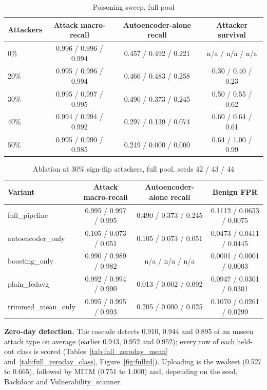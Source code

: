 \begin{table}[H]
\centering
\small
\setlength{\tabcolsep}{3pt}
\renewcommand{\arraystretch}{1.15}
\begin{tabular}{|l|c|c|c|}
\hline
\textbf{Attackers} & \textbf{Attack macro-recall} & \textbf{Autoencoder-alone recall} & \textbf{Attacker survival} \\ \hline
0\% & 0.996 / 0.996 / 0.994 & 0.457 / 0.492 / 0.221 & n/a / n/a / n/a \\ \hline
20\% & 0.995 / 0.996 / 0.994 & 0.466 / 0.483 / 0.258 & 0.30 / 0.40 / 0.23 \\ \hline
30\% & 0.995 / 0.997 / 0.995 & 0.490 / 0.373 / 0.245 & 0.50 / 0.55 / 0.62 \\ \hline
40\% & 0.994 / 0.994 / 0.992 & 0.297 / 0.139 / 0.074 & 0.60 / 0.64 / 0.61 \\ \hline
50\% & 0.995 / 0.990 / 0.985 & 0.249 / 0.000 / 0.000 & 0.64 / 1.00 / 0.99 \\ \hline
\end{tabular}
\caption{Poisoning sweep, full pool}
\label{tab:full_sweep}
\end{table}
\begin{table}[H]
\centering
\small
\setlength{\tabcolsep}{3pt}
\renewcommand{\arraystretch}{1.15}
\begin{tabular}{|l|c|c|c|}
\hline
\textbf{Variant} & \textbf{Attack macro-recall} & \textbf{Autoencoder-alone recall} & \textbf{Benign FPR} \\ \hline
full\_pipeline & 0.995 / 0.997 / 0.995 & 0.490 / 0.373 / 0.245 & 0.1112 / 0.0653 / 0.0075 \\ \hline
autoencoder\_only & 0.105 / 0.073 / 0.051 & 0.105 / 0.073 / 0.051 & 0.0473 / 0.0411 / 0.0445 \\ \hline
boosting\_only & 0.990 / 0.989 / 0.982 & n/a / n/a / n/a & 0.0001 / 0.0001 / 0.0003 \\ \hline
plain\_fedavg & 0.992 / 0.994 / 0.990 & 0.013 / 0.002 / 0.092 & 0.0947 / 0.0301 / 0.0301 \\ \hline
trimmed\_mean\_only & 0.995 / 0.995 / 0.993 & 0.205 / 0.000 / 0.025 & 0.1070 / 0.0261 / 0.0299 \\ \hline
\end{tabular}
\caption{Ablation at 30\% sign-flip attackers, full pool, seeds 42 / 43 / 44}
\label{tab:full_ablation}
\end{table}
\textbf{Zero-day detection.} The cascade detects 0.910, 0.944 and 0.895 of an unseen attack type on average (earlier 0.943, 0.952 and 0.952); every row of each held-out class is scored (Tables~\ref{tab:full_zeroday_mean} and~\ref{tab:full_zeroday_class}, Figure~\ref{fig:fullzd}). Uploading is the weakest (0.527 to 0.665), followed by MITM (0.751 to 1.000) and, depending on the seed, Backdoor and Vulnerability\_scanner.

